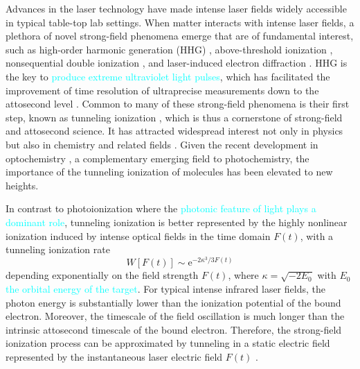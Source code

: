 \documentclass[preprint,12pt]{elsarticle} %
\newcommand{\ee}{\mathrm{e}}    %
\newcommand{\cyan}[1]{\textcolor{cyan}{#1}}     %
\begin{document}
Advances in the laser technology have made intense laser fields widely accessible in typical table-top lab settings. When matter interacts with intense laser fields, a plethora of novel strong-field phenomena emerge that are of fundamental interest, such as high-order harmonic generation (HHG) \cite{krause_high_1992,corkum_plasma_1993,popmintchev_the_2010}, above-threshold ionization \cite{agostini_free_1979,becker_above_2002,milosevic_above_2006}, nonsequential double ionization \cite{walker_precision_1994}, and laser-induced electron diffraction \cite{blaga_imaging_2012,wolter_ultrafast_2016}. HHG is the key to \cyan{produce extreme ultraviolet light pulses}, which has facilitated the improvement of time resolution of ultraprecise measurements down to the attosecond level \cite{krausz_attosecond_2009,dahlstroem_introduction_2012,pazourek_attosecond_2015,kheifets_wigner_2023}. Common to many of these strong-field phenomena is their first step, known as tunneling ionization \cite{keldysh_ionization_1965,chin_from_2004}, which is thus a cornerstone of strong-field and attosecond science. It has attracted widespread interest not only in physics but also in chemistry and related fields \cyan{\cite{smirnova_attosecond_2009,sukiasyan_exchange_2010,xie_attosecond-recollision-controlled_2012,spanner_strong-field_2012,doblhoff-dier_classical_2013,doblhoff-dier_theoretical_2016,patchkovskii_full-dimensional_2017}}. Given the recent development in optochemistry \cite{li_light_2022,ma_transient_2021}, a complementary emerging field to photochemistry, the importance of the tunneling ionization of molecules has been elevated to new heights.

In contrast to photoionization where the \cyan{photonic feature of light plays a dominant role}, tunneling ionization is better represented by the highly nonlinear ionization induced by intense optical fields in the time domain $F(t)$, with a tunneling ionization rate \cite{ammosov_tunnel_1986,delone_tunneling_1998}
\begin{equation}
    W[F(t)] \sim \ee^{-2\kappa^3/3F(t)}
    \label{eq:FieldFactor}
\end{equation}
depending exponentially on the field strength $F(t)$, where $\kappa=\sqrt{-2E_0}$ with $E_0$ \cyan{the orbital energy of the target}. For typical intense infrared laser fields, the photon energy is substantially lower than the ionization potential of the bound electron. Moreover, the timescale of the field oscillation is much longer than the intrinsic attosecond timescale of the bound electron. Therefore, the strong-field ionization process can be approximated by tunneling in a static electric field represented by the instantaneous laser electric field $F(t)$ \cite{tolstikhin_adiabatic_2010, tolstikhin_adiabatic_2012}.
\end{document}
